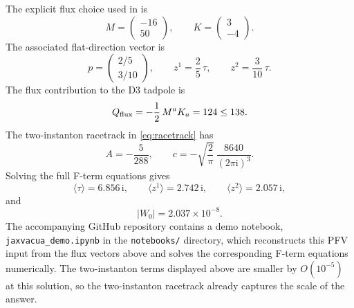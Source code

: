 \begin{example}
The explicit flux choice used in \cite{Demirtas:2019sip} is
\begin{equation}
    M=
    \begin{pmatrix}
        -16\\
        50
    \end{pmatrix},
    \qquad
    K=
    \begin{pmatrix}
        3\\
        -4
    \end{pmatrix}.
\end{equation}
The associated flat-direction vector is
\begin{equation}
    p=
    \begin{pmatrix}
        2/5\\
        3/10
    \end{pmatrix},
    \qquad
    z^1=\frac25\,\tau,\qquad
    z^2=\frac{3}{10}\,\tau .
\end{equation}
The flux contribution to the D3 tadpole is
\begin{equation}
    Q_{\rm flux}
    =
    -\frac12\,M^aK_a
    =
    124
    \leq 138.
\end{equation}
The two-instanton racetrack in \eqref{eq:racetrack} has
\begin{equation}
    A=-\frac{5}{288},
    \qquad
    c=
    -\sqrt{\frac{2}{\pi}}\,
    \frac{8640}{(2\pi\mathrm{i})^3}.
\end{equation}
Solving the full F-term equations gives
\begin{equation}
    \langle\tau\rangle=6.856\,\mathrm{i},\qquad
    \langle z^1\rangle=2.742\,\mathrm{i},\qquad
    \langle z^2\rangle=2.057\,\mathrm{i},
\end{equation}
and
\begin{equation}
    |W_0|=2.037\times10^{-8}.
\end{equation}
The accompanying GitHub repository contains a demo notebook,
\texttt{jaxvacua\_demo.ipynb} in the \texttt{notebooks/} directory,
which reconstructs this PFV input from the flux vectors above and
solves the corresponding F-term equations numerically.
The two-instanton terms displayed above are smaller by
$O(10^{-5})$ at this solution, so the two-instanton racetrack already
captures the scale of the answer.  


\end{example}

